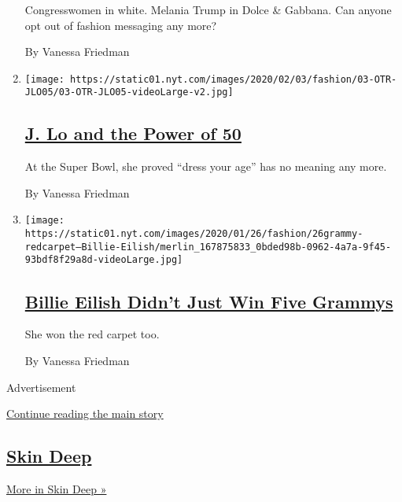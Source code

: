\begin{enumerate}
  Congresswomen in white. Melania Trump in Dolce \& Gabbana. Can anyone
  opt out of fashion messaging any more?

  By Vanessa Friedman
\item
  \texttt{[image: https://static01.nyt.com/images/2020/02/03/fashion/03-OTR-JLO05/03-OTR-JLO05-videoLarge-v2.jpg]}

  \hypertarget{j-lo-and-the-power-of-50}{%
  \subsection{\texorpdfstring{\href{/2020/02/03/style/jennifer-lopez-super-bowl.html}{J.
  Lo and the Power of
  50}}{J. Lo and the Power of 50}}\label{j-lo-and-the-power-of-50}}

  At the Super Bowl, she proved ``dress your age'' has no meaning any
  more.

  By Vanessa Friedman
\item
  \texttt{[image: https://static01.nyt.com/images/2020/01/26/fashion/26grammy-redcarpet--Billie-Eilish/merlin\_167875833\_0bded98b-0962-4a7a-9f45-93bdf8f29a8d-videoLarge.jpg]}

  \hypertarget{billie-eilish-didnt-just-win-five-grammys}{%
  \subsection{\texorpdfstring{\href{/2020/01/27/fashion/billie-eilish-grammys.html}{Billie
  Eilish Didn't Just Win Five
  Grammys}}{Billie Eilish Didn't Just Win Five Grammys}}\label{billie-eilish-didnt-just-win-five-grammys}}

  She won the red carpet too.

  By Vanessa Friedman
\end{enumerate}

Advertisement

\protect\hyperlink{after-mid5}{Continue reading the main story}

\hypertarget{skin-deep-1}{%
\subsection{\texorpdfstring{\href{/column/skin-deep}{Skin
Deep}}{Skin Deep}}\label{skin-deep-1}}

\href{/column/skin-deep}{More in Skin Deep »}

